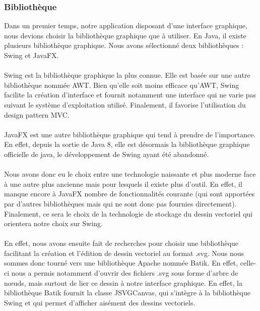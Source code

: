 \documentclass[a4paper,11pt]{article}
\begin{document}
\subsubsection{Bibliothèque}
Dans un premier temps, notre application disposant d'une interface graphique, nous devions choisir la bibliothèque graphique que à utiliser. En Java, il existe plusieurs bibliothèque graphique. Nous avons sélectionné deux bibliothèques : Swing et JavaFX.

\paragraph{} Swing est la bibliothèque graphique la plus connue. Elle est basée sur une autre bibliothèque nommée AWT. Bien qu'elle soit moins efficace qu'AWT, Swing facilite la création d'interface et fournit notamment une interface qui ne varie pas suivant le système d'exploitation utilisé. Finalement, il favorise l'utilisation du design pattern MVC.

\paragraph{} JavaFX est une autre bibliothèque graphique qui tend à prendre de l'importance. En effet, depuis la sortie de Java 8, elle est désormais la bibliothèque graphique officielle de java, le développement de Swing ayant été abandonné.

\paragraph{} Nous avons donc eu le choix entre une technologie naissante et plus moderne face à une autre plus ancienne mais pour lesquels il existe plus d'outil. En effet, il manque encore à JavaFX nombre de fonctionnalités courante (qui sont apportées par d'autres bibliothèques mais qui ne sont donc pas fournies directement). Finalement, ce sera le choix de la technologie de stockage du dessin vectoriel qui orientera notre choix sur Swing.

\paragraph{} En effet, nous avons ensuite fait de recherches pour choisir une bibliothèque facilitant la création et l'édition de dessin vectoriel au format .svg. Nous nous sommes donc tourné vers une bibliothèque Apache nommée Batik. En effet, celle-ci nous a permis notamment d'ouvrir des fichiers .svg sous forme d'arbre de nœuds, mais surtout de lier ce dessin à notre interface graphique. En effet, la bibliothèque Batik fournit la classe JSVGCanvas, qui s'intègre à la bibliothèque Swing et qui permet d'afficher aisément des dessins vectoriels.
\end{document}
